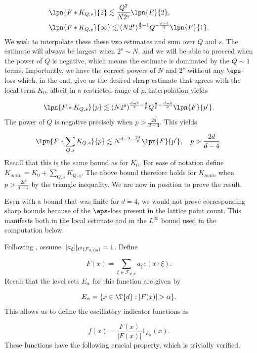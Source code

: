 \documentclass[11pt]{amsart}
\begin{document}
\begin{align*}
    &\lpn{F* K_{Q,s}}{2}\lesssim \frac{Q^2}{N2^s}\lpn{F}{2},\\
    &\lpn{F* K_{Q,s}}{\infty}\lesssim (N2^s)^{\frac{d}{2}-1}Q^{-\frac{d-4}{2}}\lpn{F}{1}.
\end{align*}
We wish to interpolate these these two estimates and sum over $Q$ and $s$. The estimate will always be largest when $2^s\sim N$, and we will be able to proceed when the power of $Q$ is negative, which means the estimate is dominated by the $Q\sim 1$ terms. Importantly, we have the correct powers of $N$ and $2^s$ without any $\eps$-loss which, in the end, give us the desired sharp estimate that agrees with the local term $K_0$, albeit in a restricted range of $p$. Interpolation yields

\begin{equation}\label{3: balanceQEqn}
    \lpn{F* K_{Q, s}}{p}\lesssim (N2^s)^{\frac{d-2}{2}-\frac{d}{p}}Q^{\frac{d}{p}-\frac{d-4}{2}}\lpn{F}{p'}.
\end{equation}
The power of $Q$ is negative precisely when $p>\frac{2d}{d-4}$. This yields

\begin{equation*}
    \lpn{F* \sum_{Q,s} K_{Q,s}}{p}\lesssim N^{d-2-\frac{2d}{p}}\lpn{F}{p'},\quad p>\frac{2d}{d-4}.
\end{equation*}
Recall that this is the same bound as for $K_0$. For ease of notation define $K_{main} = K_0 + \sum_{Q,s}K_{Q, s}$. The above bound therefore holds for $K_{main}$ when $p>\frac{2d}{d-4}$ by the triangle inequality. We are now in position to prove the result.

\begin{remark}
    Even with a bound that was finite for $d=4$, we would not prove corresponding sharp bounds because of the $\eps$-loss present in the lattice point count. This manifests both in the local estimate and in the $L^\infty$ bound used in the computation below.
\end{remark}
\noindent
Following \cite{bourgainDemeterDiscreteRestrictImprovements2013}, assume $\|a_\xi\|_{\ell^2(\mathcal{F}_{d,\la})}=1$. Define

$$F(x) = \sum_{\xi\in \mathcal{F}_{d,N}}a_\xi e(x\cdot \xi).$$
Recall that the level sets $E_\alpha$ for this function are given by

$$E_\alpha = \{x\in\T{d}: |F(x)|>\alpha\}.$$
This allows us to define the oscillatory indicator functions as

\begin{equation*}
    f(x)=\frac{F(x)}{|F(x)|}1_{E_{\alpha}}(x).
\end{equation*}
These functions have the following crucial property, which is trivially verified.
\end{document}
